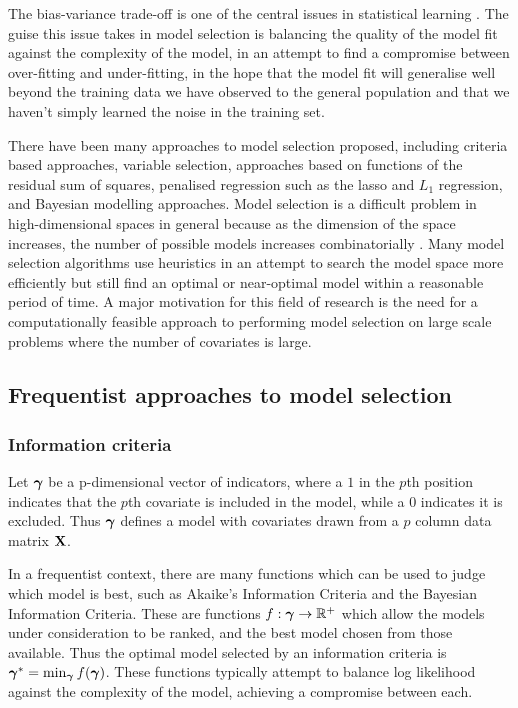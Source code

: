 The bias-variance trade-off is one of the central issues in statistical learning
\citep{Murphy:2012:MLP:2380985, Bishop:2006:PRM:1162264, hastie01statisticallearning}. The guise this issue
takes in model selection is balancing the quality of the model fit against the complexity of the model, in an
attempt to find a compromise between over-fitting and under-fitting, in the hope that the model fit will
generalise well beyond the training data we have observed to the general population and that we haven't simply
learned the noise in the training set.

There have been many approaches to model selection proposed, including criteria based approaches, variable
selection, approaches based on functions of the residual sum of squares, penalised regression such as the
lasso and $L_1$ regression, and Bayesian modelling approaches. Model selection is a difficult problem in
high-dimensional spaces in general because as the dimension of the space increases, the number of possible models
increases combinatorially \citep{Schelldorfer2010}. Many model selection algorithms use heuristics in an
attempt to search the model space more efficiently but still find an optimal or near-optimal model within a
reasonable period of time. A major motivation for this field of research is the need for a computationally
feasible approach to performing model selection on large scale problems where the number of covariates is
large.

\subsection{Frequentist approaches to model selection}
\subsubsection{Information criteria}
Let ${\boldsymbol \gamma}$ be a p-dimensional vector of indicators, where a $1$ in the $p$th position indicates that the
$p$th covariate is included in the model, while a $0$ indicates it is excluded. Thus ${\boldsymbol \gamma}$ defines a
model with covariates drawn from a $p$ column data matrix ${\bf X}$.

In a frequentist context, there are many functions which can be used to judge which model is best, such as
Akaike's Information Criteria and the Bayesian Information Criteria. These are functions $f: {\boldsymbol \gamma} \to {\mathbb{R}}^+$
which allow the models under consideration to be ranked, and the best model chosen from those available. Thus
the optimal model selected by an information criteria is ${\boldsymbol \gamma}^* = \min_{\boldsymbol \gamma} f({\boldsymbol \gamma})$. These functions
typically attempt to balance log likelihood against the complexity of the model, achieving a compromise
between each.

